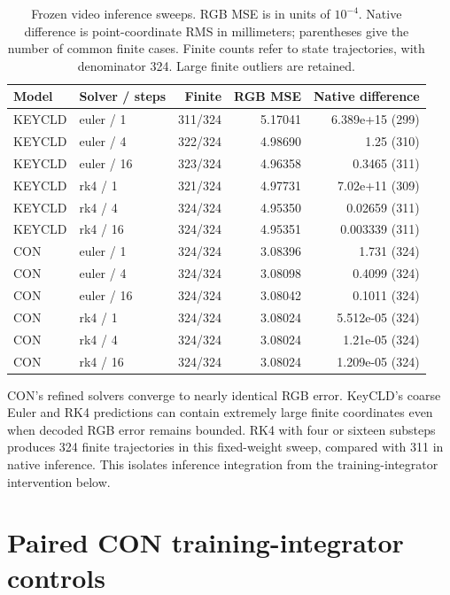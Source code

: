 \begin{table}[!t]
\caption{Frozen video inference sweeps. RGB MSE is in units of $10^{-4}$. Native difference is point-coordinate RMS in millimeters; parentheses give the number of common finite cases. Finite counts refer to state trajectories, with denominator 324. Large finite outliers are retained.}
\label{app:inference-solvers}
\centering\small
\begin{tabular}{llrrr}
\toprule
Model & Solver / steps & Finite & RGB MSE & Native difference\\
\midrule
KEYCLD & euler / 1 & 311/324 & 5.17041 & 6.389e+15 (299) \\
KEYCLD & euler / 4 & 322/324 & 4.98690 & 1.25 (310) \\
KEYCLD & euler / 16 & 323/324 & 4.96358 & 0.3465 (311) \\
KEYCLD & rk4 / 1 & 321/324 & 4.97731 & 7.02e+11 (309) \\
KEYCLD & rk4 / 4 & 324/324 & 4.95350 & 0.02659 (311) \\
KEYCLD & rk4 / 16 & 324/324 & 4.95351 & 0.003339 (311) \\
CON & euler / 1 & 324/324 & 3.08396 & 1.731 (324) \\
CON & euler / 4 & 324/324 & 3.08098 & 0.4099 (324) \\
CON & euler / 16 & 324/324 & 3.08042 & 0.1011 (324) \\
CON & rk4 / 1 & 324/324 & 3.08024 & 5.512e-05 (324) \\
CON & rk4 / 4 & 324/324 & 3.08024 & 1.21e-05 (324) \\
CON & rk4 / 16 & 324/324 & 3.08024 & 1.209e-05 (324) \\
\bottomrule
\end{tabular}
\end{table}

CON's refined solvers converge to nearly identical RGB error. KeyCLD's coarse Euler and RK4 predictions can contain extremely large finite coordinates even when decoded RGB error remains bounded. RK4 with four or sixteen substeps produces 324 finite trajectories in this fixed-weight sweep, compared with 311 in native inference. This isolates inference integration from the training-integrator intervention below.

\section{Paired CON training-integrator controls}
\label{app:con-integrators}

